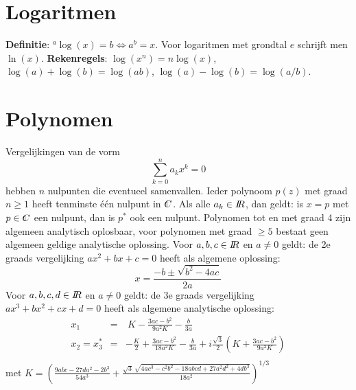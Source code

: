 \documentclass[twoside]{report}
\begin{document}
\section{Logaritmen}
{\bf Definitie}: $^a\log(x)=b\Leftrightarrow a^b=x$. Voor logaritmen met
grondtal $e$ schrijft men $\ln(x)$.
\npar
{\bf Rekenregels}: $\log(x^n)=n\log(x)$, $\log(a)+\log(b)=\log(ab)$,
$\log(a)-\log(b)=\log(a/b)$.

\section{Polynomen}
Vergelijkingen van de vorm
\[
\sum_{k=0}^n a_kx^k=0
\]
hebben $n$ nulpunten die eventueel samenvallen. Ieder polynoom $p(z)$ met
graad $n\geq1$ heeft tenminste \'e\'en nulpunt in $\CC$.
Als alle $a_k\in I\hspace{-1mm}R$, dan geldt: is $x=p$ met $p\in\CC$ een nulpunt, dan is
$p^*$ ook een nulpunt. Polynomen tot en met graad 4 zijn algemeen analytisch
oplosbaar, voor polynomen met graad $\geq5$ bestaat geen algemeen geldige
analytische oplossing.
\npar
Voor $a,b,c\in I\hspace{-1mm}R$ en $a\neq0$ geldt:
de 2e graads vergelijking $ax^2+bx+c=0$ heeft als algemene oplossing:
\[
x=\frac{-b\pm\sqrt{b^2-4ac}}{2a}
\]
Voor $a,b,c,d\in I\hspace{-1mm}R$ en $a\neq0$ geldt:
de 3e graads vergelijking $ax^3+bx^2+cx+d=0$ heeft als algemene analytische
oplossing:
\begin{eqnarray*}
x_1&=&~K-\frac{3ac-b^2}{9a^2K}-\frac{b}{3a}\\
x_2=x_3^*&=&-\frac{K}{2}+\frac{3ac-b^2}{18a^2K}-\frac{b}{3a}+i\frac{\sqrt{3}}{2}\left(K+\frac{3ac-b^2}{9a^2K}\right)\\
\end{eqnarray*}
met $\displaystyle K=\left(\frac{9abc-27da^2-2b^3}{54a^3}+
\frac{\sqrt{3}\,\sqrt{4ac^3-c^2b^2-18abcd+27a^2d^2+4db^3}}{18a^2}\right)^{1/3}$
\end{document}
